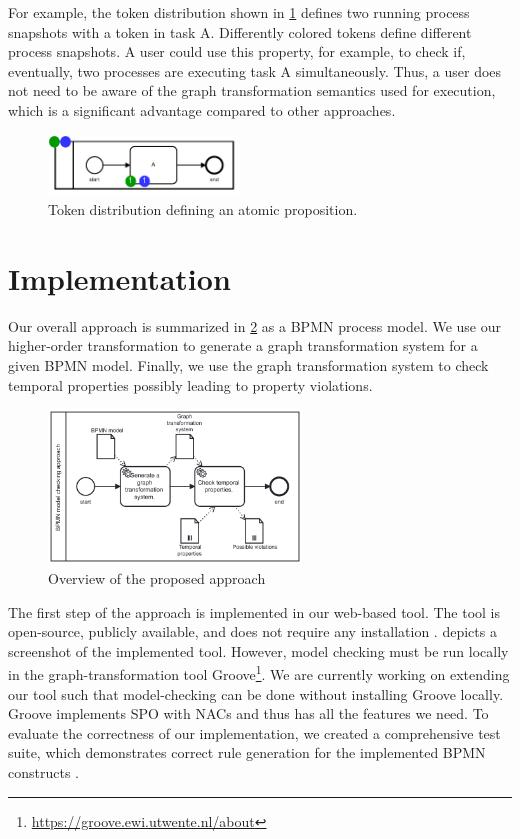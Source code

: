 \documentclass[submission, copyright, creativecommons]{eptcs}
\begin{document}
For example, the token distribution shown in \cref{fig:atomicProposition} defines two running process snapshots with a token in task A.
Differently colored tokens define different process snapshots.
A user could use this property, for example, to check if, eventually, two processes are executing task A simultaneously.
Thus, a user does not need to be aware of the graph transformation semantics used for execution, which is a significant advantage compared to other approaches.

\begin{figure}[h]
    \centering
    \includegraphics[width=0.45\textwidth]{images/bpmn_semantics-atomic-proposition.pdf}
    \caption{Token distribution defining an atomic proposition.}
    \label{fig:atomicProposition}
\end{figure}


\section{Implementation} \label{sec:impl}
Our overall approach is summarized in \cref{fig:approach} as a BPMN process model.
We use our higher-order transformation to generate a graph transformation system for a given BPMN model.
Finally, we use the graph transformation system to check temporal properties possibly leading to property violations.

\begin{figure}[h!]
    \centering
    \includegraphics[width=0.6\textwidth]{images/full-approach.pdf}
    \caption{Overview of the proposed approach}
    \label{fig:approach}
\end{figure}

The first step of the approach is implemented in our web-based tool.
The tool is open-source, publicly available, and does not require any installation \cite{timkrauterArtifactsTERMGRAPH2022}.
 depicts a screenshot of the implemented tool.
However, model checking must be run locally in the graph-transformation tool Groove\footnote{\url{https://groove.ewi.utwente.nl/about}}.
We are currently working on extending our tool such that model-checking can be done without installing Groove locally.
Groove implements SPO with NACs and thus has all the features we need.
To evaluate the correctness of our implementation, we created a comprehensive test suite, which demonstrates correct rule generation for the implemented BPMN constructs \cite{timkrauterArtifactsTERMGRAPH2022}.
\end{document}
